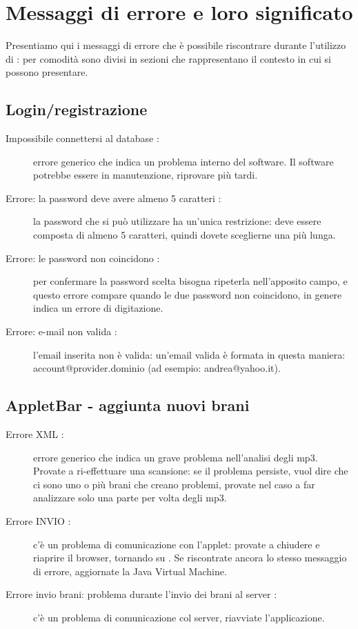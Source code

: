 \appendix %
\chapter{Messaggi di errore e loro significato}
\thispagestyle{fancy}
Presentiamo qui i messaggi di errore che \`e possibile riscontrare durante
l'utilizzo di : per comodit\`a sono divisi in sezioni che
rappresentano il contesto in cui si possono presentare.
\section{Login/registrazione}
\begin{description}
	\item[Impossibile connettersi al database :] errore generico che
	indica un problema interno del software. Il software potrebbe essere in manutenzione,
	riprovare pi\`u tardi.
	\item[Errore: la password deve avere almeno 5 caratteri :] la password
	che si pu\`o utilizzare ha un'unica restrizione: deve essere composta di almeno 5
	caratteri, quindi dovete sceglierne una pi\`u lunga.
	\item [Errore: le password non coincidono :] per confermare la
	password scelta bisogna ripeterla nell'apposito campo, e questo errore compare
	quando le due password non coincidono, in genere indica un errore di
	digitazione.
	\item[Errore: e-mail non valida :] l'email inserita non \`e valida:
	un'email valida \`e formata in questa maniera: account@provider.dominio (ad
	esempio: andrea@yahoo.it).
\end{description}

\section{AppletBar - aggiunta nuovi brani}
\begin{description}
	\item [Errore XML :] errore generico che
	indica un grave problema nell'analisi degli mp3. Provate a ri-effettuare una
	scansione: se il problema persiste, vuol dire che ci sono uno o pi\`u brani che
	creano problemi, provate nel caso a far analizzare solo una parte per volta
	degli mp3.
	\item [Errore INVIO :] c'\`e un problema di comunicazione con l'applet:
	provate a chiudere e riaprire il browser, tornando su . Se
	riscontrate ancora lo stesso messaggio di errore, aggiornate la Java Virtual
	Machine.
	\item [Errore invio brani: problema durante l'invio dei brani al server :]
	c'\`e un problema di comunicazione col server, riavviate l'applicazione.
\end{description}

